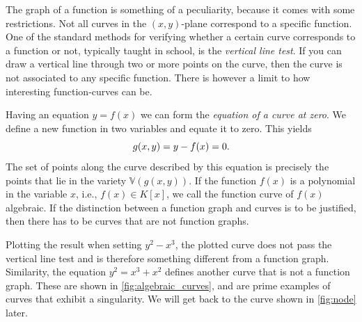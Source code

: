 \documentclass{article}
\newcommand{\V}{\ensuremath{\mathbb{V}}}
\begin{document}
    The graph of a function is something of a peculiarity, because it comes
    with some restrictions. Not all curves in the $(x, y)$-plane correspond to
    a specific function. One of the standard methods for verifying whether a
    certain curve corresponds to a function or not, typically taught in school,
    is the \emph{vertical line test}. If you can draw a vertical line through
    two or more points on the curve, then the curve is not associated to any
    specific function. There is however a limit to how interesting
    function-curves can be.

    Having an equation $y = f(x)$ we can form the \emph{equation of a curve at
    zero}. We define a new function in two variables and equate it to zero.
    This yields
    \begin{equation}
        \notag
        g(x, y) = y - f(x) = 0.
    \end{equation}
    The set of points along the curve described by this equation is precisely
    the points that lie in the variety $\V(g(x, y))$.
    If the function $f(x)$ is a polynomial in the variable $x$, i.e., $f(x) \in
    K[x]$, we call the function curve of $f(x)$ algebraic. If the distinction
    between a function graph and curves is to be justified, then there has to
    be curves that are not function graphs.

    Plotting the result when setting $y^2 - x^3$, the plotted curve does not
    pass the vertical line test and is therefore something different from a
    function graph. Similarity, the equation $y^2 = x^3 + x^2$ defines another
    curve that is not a function graph. These are shown in
    \cref{fig:algebraic_curves}, and are prime examples of curves that exhibit
    a singularity. We will get back to the curve shown in \cref{fig:node}
    later.
\end{document}
